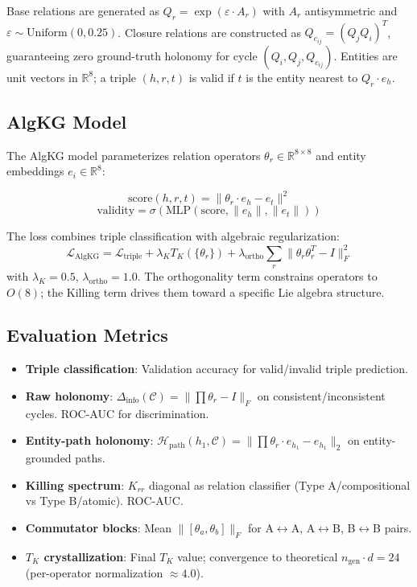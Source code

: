 \documentclass[11pt,letterpaper]{article}
\newcommand{\KL}{\mathcal{L}}
\newcommand{\KH}{\mathcal{H}}
\newcommand{\KC}{\mathcal{C}}
\newcommand{\deltainfo}{\Delta_{\text{info}}}
\newcommand{\eps}{\varepsilon}
\begin{document}
Base relations are generated as $Q_r = \exp(\eps \cdot A_r)$ with $A_r$ antisymmetric and $\eps \sim \text{Uniform}(0, 0.25)$. Closure relations are constructed as $Q_{c_{ij}} = (Q_j Q_i)^T$, guaranteeing zero ground-truth holonomy for cycle $(Q_i, Q_j, Q_{c_{ij}})$. Entities are unit vectors in $\mathbb{R}^8$; a triple $(h, r, t)$ is valid if $t$ is the entity nearest to $Q_r \cdot e_h$.

\subsection{AlgKG Model}

The AlgKG model parameterizes relation operators $\theta_r \in \mathbb{R}^{8 \times 8}$ and entity embeddings $e_i \in \mathbb{R}^8$:

\begin{equation}
\text{score}(h, r, t) = \|\theta_r \cdot e_h - e_t\|^2
\end{equation}
\begin{equation}
\text{validity} = \sigma(\text{MLP}(\text{score}, \|e_h\|, \|e_t\|))
\end{equation}

The loss combines triple classification with algebraic regularization:
\begin{equation}
\KL_{\text{AlgKG}} = \KL_{\text{triple}} + \lambda_K T_K(\{\theta_r\}) + \lambda_{\text{ortho}} \sum_r \|\theta_r \theta_r^T - I\|_F^2
\end{equation}
with $\lambda_K = 0.5$, $\lambda_{\text{ortho}} = 1.0$. The orthogonality term constrains operators to $O(8)$; the Killing term drives them toward a specific Lie algebra structure.

\subsection{Evaluation Metrics}

\begin{itemize}[noitemsep]
\item \textbf{Triple classification}: Validation accuracy for valid/invalid triple prediction.
\item \textbf{Raw holonomy}: $\deltainfo(\KC) = \|\prod \theta_r - I\|_F$ on consistent/inconsistent cycles. ROC-AUC for discrimination.
\item \textbf{Entity-path holonomy}: $\KH_{\text{path}}(h_1, \KC) = \|\prod \theta_r \cdot e_{h_1} - e_{h_1}\|_2$ on entity-grounded paths.
\item \textbf{Killing spectrum}: $K_{rr}$ diagonal as relation classifier (Type A/compositional vs Type B/atomic). ROC-AUC.
\item \textbf{Commutator blocks}: Mean $\|\![\theta_a, \theta_b]\!\|_F$ for A$\leftrightarrow$A, A$\leftrightarrow$B, B$\leftrightarrow$B pairs.
\item \textbf{$T_K$ crystallization}: Final $T_K$ value; convergence to theoretical $n_{\text{gen}} \cdot d = 24$ (per-operator normalization $\approx 4.0$).
\end{itemize}
\end{document}
